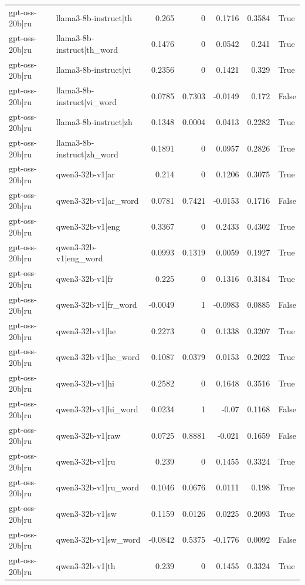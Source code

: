 \begin{table}
\begin{tabular}{l l r r r r l}
gpt-oss-20b|ru & llama3-8b-instruct|th & 0.265 & 0 & 0.1716 & 0.3584 & True \\
gpt-oss-20b|ru & llama3-8b-instruct|th_word & 0.1476 & 0 & 0.0542 & 0.241 & True \\
gpt-oss-20b|ru & llama3-8b-instruct|vi & 0.2356 & 0 & 0.1421 & 0.329 & True \\
gpt-oss-20b|ru & llama3-8b-instruct|vi_word & 0.0785 & 0.7303 & -0.0149 & 0.172 & False \\
gpt-oss-20b|ru & llama3-8b-instruct|zh & 0.1348 & 0.0004 & 0.0413 & 0.2282 & True \\
gpt-oss-20b|ru & llama3-8b-instruct|zh_word & 0.1891 & 0 & 0.0957 & 0.2826 & True \\
gpt-oss-20b|ru & qwen3-32b-v1|ar & 0.214 & 0 & 0.1206 & 0.3075 & True \\
gpt-oss-20b|ru & qwen3-32b-v1|ar_word & 0.0781 & 0.7421 & -0.0153 & 0.1716 & False \\
gpt-oss-20b|ru & qwen3-32b-v1|eng & 0.3367 & 0 & 0.2433 & 0.4302 & True \\
gpt-oss-20b|ru & qwen3-32b-v1|eng_word & 0.0993 & 0.1319 & 0.0059 & 0.1927 & True \\
gpt-oss-20b|ru & qwen3-32b-v1|fr & 0.225 & 0 & 0.1316 & 0.3184 & True \\
gpt-oss-20b|ru & qwen3-32b-v1|fr_word & -0.0049 & 1 & -0.0983 & 0.0885 & False \\
gpt-oss-20b|ru & qwen3-32b-v1|he & 0.2273 & 0 & 0.1338 & 0.3207 & True \\
gpt-oss-20b|ru & qwen3-32b-v1|he_word & 0.1087 & 0.0379 & 0.0153 & 0.2022 & True \\
gpt-oss-20b|ru & qwen3-32b-v1|hi & 0.2582 & 0 & 0.1648 & 0.3516 & True \\
gpt-oss-20b|ru & qwen3-32b-v1|hi_word & 0.0234 & 1 & -0.07 & 0.1168 & False \\
gpt-oss-20b|ru & qwen3-32b-v1|raw & 0.0725 & 0.8881 & -0.021 & 0.1659 & False \\
gpt-oss-20b|ru & qwen3-32b-v1|ru & 0.239 & 0 & 0.1455 & 0.3324 & True \\
gpt-oss-20b|ru & qwen3-32b-v1|ru_word & 0.1046 & 0.0676 & 0.0111 & 0.198 & True \\
gpt-oss-20b|ru & qwen3-32b-v1|sw & 0.1159 & 0.0126 & 0.0225 & 0.2093 & True \\
gpt-oss-20b|ru & qwen3-32b-v1|sw_word & -0.0842 & 0.5375 & -0.1776 & 0.0092 & False \\
gpt-oss-20b|ru & qwen3-32b-v1|th & 0.239 & 0 & 0.1455 & 0.3324 & True \\

\end{tabular}
\end{table}
